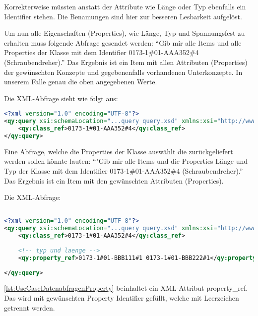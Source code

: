 Korrekterweise müssten anstatt der Attribute wie Länge oder Typ ebenfalls ein Identifier stehen. Die Benamungen sind hier zur besseren Lesbarkeit aufgelöst. 

Um nun alle Eigenschaften (Properties), wie Länge, Typ und Spannungsfest zu erhalten muss folgende Abfrage gesendet werden: 
\enquote{Gib mir alle Items und alle Properties der Klasse mit dem Identifier 0173-1\#01-AAA352\#4 (Schraubendreher).}
Das Ergebnis ist ein Item mit allen Attributen (Properties) der gewünschten Konzepte und gegebenenfalls vorhandenen Unterkonzepte. In unserem Falle genau die oben angegebenen Werte.

Die XML-Abfrage sieht wie folgt aus:

\begin{lstlisting}[caption=Query Beispiel - Daten abfragen, language=XML, label=UseCaseDatenabfragenAnhang]
<?xml version="1.0" encoding="UTF-8"?>
<qy:query xsi:schemaLocation="...query query.xsd" xmlns:xsi="http://www.w3.org/2001/XMLSchema-instance" xmlns:cat="...catalogue" xmlns:val="...value" xmlns:qy="...query" xmlns:bas="...basic">
	<qy:class_ref>0173-1#01-AAA352#4</qy:class_ref>
</qy:query>
\end{lstlisting}

Eine Abfrage, welche die Properties der Klasse auswählt die zurückgeliefert werden sollen könnte lauten: 
\enquote{"Gib mir alle Items und die Properties Länge und Typ der Klasse mit dem Identifier 0173-1\#01-AAA352\#4 (Schraubendreher).}
Das Ergebnis ist ein Item mit den gewünschten Attributen (Properties). 

Die XML-Abfrage:
\begin{lstlisting}[caption=Query Beispiel - Daten abfragen mit Propertyeinschränkung, language=XML, label=lst:UseCaseDatenabfragenProperty]

<?xml version="1.0" encoding="UTF-8"?>
<qy:query xsi:schemaLocation="...query query.xsd" xmlns:xsi="http://www.w3.org/2001/XMLSchema-instance" xmlns:cat="...catalogue" xmlns:val="...value" xmlns:qy="...query" xmlns:bas="...basic">
	<qy:class_ref>0173-1#01-AAA352#4</qy:class_ref>
	
	<!-- typ und laenge -->
	<qy:property_ref>0173-1#01-BBB111#1 0173-1#01-BBB222#1</qy:property_ref> 
	
</qy:query>
\end{lstlisting}

\autoref{lst:UseCaseDatenabfragenProperty} beinhaltet ein XML-Attribut property\_ref. Das wird mit gewünschten Property Identifier gefüllt, welche mit Leerzeichen getrennt werden. 

